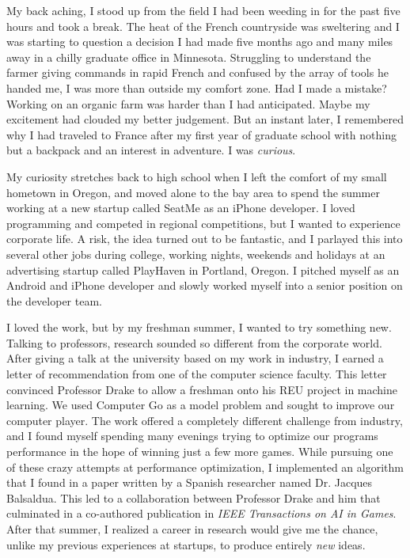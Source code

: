 \documentclass[12pt]{article}
\title{}
\begin{document}
My back aching, I stood up from the field I had been weeding in for the past five hours and took a break. The heat of the French countryside was sweltering and I was starting to question a  decision I had made five months ago and many miles away in a chilly graduate office in Minnesota. Struggling to understand the farmer giving commands in rapid French and confused by the array of tools he handed me, I was more than outside my comfort zone. Had I made a mistake? Working on an organic farm was harder than I had anticipated. Maybe my excitement had clouded my better judgement. But an instant later, I remembered why I had traveled to France after my first year of graduate school with nothing but a backpack and an interest in adventure. I was \textit{curious}.  

My curiosity stretches back to high school when I left the comfort of my small hometown in Oregon, and moved alone to the bay area to spend the summer working at a new startup called SeatMe as an iPhone developer. I loved programming and competed in regional competitions, but I wanted to experience corporate life. A risk, the idea turned out to be fantastic, and I parlayed this into several other jobs during college, working nights, weekends and holidays at an advertising startup called PlayHaven in Portland, Oregon. I pitched myself as an Android and iPhone developer and slowly worked myself into a senior position on the developer team. 

I loved the work, but by my freshman summer, I wanted to try something new. Talking to professors, research sounded so different from the corporate world. After giving a talk at the university based on my work in industry, I earned a letter of recommendation from one of the computer science faculty. This letter convinced Professor Drake to allow a freshman onto his REU project in machine learning. We used Computer Go as a model problem and sought to improve our computer player. The work offered a completely different challenge from industry, and I found myself spending many evenings trying to optimize our programs performance in the hope of winning just a few more games. While pursuing one of these crazy attempts at performance optimization, I implemented an algorithm that I found in a paper written by a Spanish researcher named Dr. Jacques Balsaldua. This led to a collaboration between Professor Drake and him that culminated in a co-authored publication in \textit{IEEE Transactions on AI in Games}. After that summer, I realized a career in research would give me the chance, unlike my previous experiences at startups, to produce entirely \textit{new} ideas.
\end{document}
